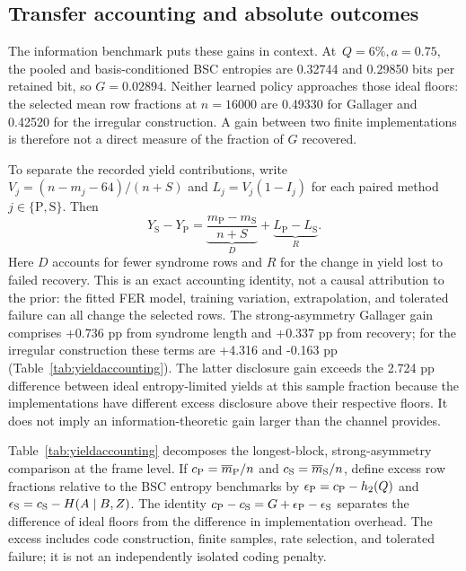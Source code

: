 \subsection{Transfer accounting and absolute outcomes}
The information benchmark puts these gains in context. At~\mbox{$Q=6\%,a=0.75$},
the pooled and basis-conditioned BSC entropies are 0.32744 and 0.29850 bits per
retained bit, so $G=0.02894$. Neither learned policy approaches those ideal floors:
the selected mean row fractions at $n=16000$ are 0.49330 for Gallager and 0.42520
for the irregular construction. A gain between two finite implementations is
therefore not a direct measure of the fraction of $G$ recovered.

To separate the recorded yield contributions, write $V_j=(n-m_j-64)/(n+S)$ and
$L_j=V_j(1-I_j)$ for each paired method $j\in\{\mathrm P,\mathrm S\}$. Then
\begin{equation}
 Y_{\mathrm S}-Y_{\mathrm P}
 =\underbrace{\frac{m_{\mathrm P}-m_{\mathrm S}}{n+S}}_{D}
 +\underbrace{L_{\mathrm P}-L_{\mathrm S}}_{R}.
 \label{eq:yielddecomposition}
\end{equation}
Here $D$ accounts for fewer syndrome rows and $R$ for the change in yield lost to
failed recovery. This is an exact accounting identity, not a causal attribution to
the prior: the fitted FER model, training variation, extrapolation, and tolerated
failure can all change the selected rows. The strong-asymmetry Gallager gain comprises +0.736 pp from
syndrome length and +0.337 pp from recovery; for the irregular construction these
terms are +4.316 and -0.163 pp (Table~\ref{tab:yieldaccounting}). The latter disclosure gain exceeds the 2.724 pp
difference between ideal entropy-limited yields at this sample fraction because
the implementations have different excess disclosure above their respective floors.
It does not imply an information-theoretic gain larger than the channel provides.


Table~\ref{tab:yieldaccounting} decomposes the longest-block, strong-asymmetry
comparison at the frame level. If $c_{\rm P}=\overline m_{\rm P}/n$ and
$c_{\rm S}=\overline m_{\rm S}/n$, define excess row fractions relative to the BSC
entropy benchmarks by $\epsilon_{\rm P}=c_{\rm P}-h_2(Q)$ and
$\epsilon_{\rm S}=c_{\rm S}-H(A\mid B,Z)$. The identity
$c_{\rm P}-c_{\rm S}=G+\epsilon_{\rm P}-\epsilon_{\rm S}$ separates the difference
of ideal floors from the difference in implementation overhead. The excess includes
code construction, finite samples, rate selection, and tolerated failure; it is not
an independently isolated coding penalty.



